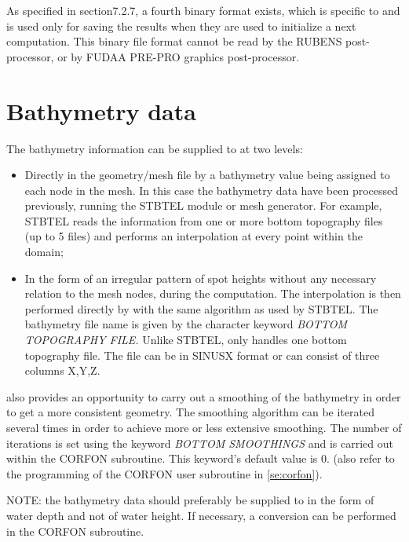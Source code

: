  As specified in section7.2.7, a fourth binary format exists, which is specific to \tomawac and is used only for saving the results when they are used to initialize a next computation. This binary file format cannot be read by the RUBENS post-processor, or by FUDAA PRE-PRO graphics post-processor.


\section{ Bathymetry data }
\label{se:bathydata}
 The bathymetry information can be supplied to \tomawac at two levels:

\begin{itemize}
\item  Directly in the geometry/mesh file by a bathymetry value being assigned to each node in the mesh. In this case the bathymetry data have been processed previously, running the STBTEL module or mesh generator. For example, STBTEL reads the information from one or more bottom topography files (up to 5 files) and performs an interpolation at every point within the domain;

\item  In the form of an irregular pattern of spot heights without any necessary relation to the mesh nodes, during the \tomawac computation. The interpolation is then performed directly by \tomawac with the same algorithm as used by STBTEL. The bathymetry file name is given by the character keyword \textit{BOTTOM TOPOGRAPHY FILE. }Unlike STBTEL, \tomawac only handles one bottom topography file. The file can be in SINUSX format or can consist of three columns X,Y,Z.
\end{itemize}

 \tomawac also provides an opportunity to carry out a smoothing of the bathymetry in order to get a more consistent geometry. The smoothing algorithm can be iterated several times in order to achieve more or less extensive smoothing. The number of iterations is set using the keyword \textit{BOTTOM SMOOTHINGS} and is carried out within the CORFON subroutine. This keyword's default value is 0. (also refer to the programming of the CORFON user subroutine in \ref{se:corfon}).

 NOTE: the bathymetry data should preferably be supplied to \tomawac in the form of water depth and not of water height. If necessary, a conversion can be performed in the CORFON subroutine.


